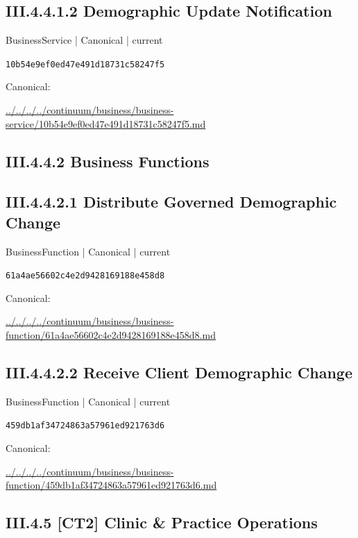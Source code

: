 \documentclass[10pt,a4paper]{article}
\begin{document}
\subsection*{III.4.4.1.2 Demographic Update Notification}
{\small BusinessService | Canonical | current}\par
\texttt{10b54e9ef0ed47e491d18731c58247f5}\par
Canonical: \par
{\footnotesize\url{../../../../continuum/business/business-service/10b54e9ef0ed47e491d18731c58247f5.md}}\par
\subsection*{III.4.4.2 Business Functions}
\subsection*{III.4.4.2.1 Distribute Governed Demographic Change}
{\small BusinessFunction | Canonical | current}\par
\texttt{61a4ae56602c4e2d9428169188e458d8}\par
Canonical: \par
{\footnotesize\url{../../../../continuum/business/business-function/61a4ae56602c4e2d9428169188e458d8.md}}\par
\subsection*{III.4.4.2.2 Receive Client Demographic Change}
{\small BusinessFunction | Canonical | current}\par
\texttt{459db1af34724863a57961ed921763d6}\par
Canonical: \par
{\footnotesize\url{../../../../continuum/business/business-function/459db1af34724863a57961ed921763d6.md}}\par
\subsection*{III.4.5 [CT2] Clinic \& Practice Operations}
\end{document}
